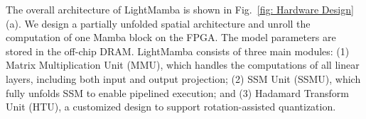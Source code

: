 The overall architecture of LightMamba is shown in Fig.~\ref{fig: Hardware Design} (a). 
We design a partially unfolded spatial architecture and unroll the computation of one Mamba block on the FPGA.
The model parameters are stored in the off-chip DRAM.
LightMamba consists of three main modules: (1) Matrix Multiplication Unit (MMU), which handles the computations of all linear layers, including both input and output projection; (2) SSM Unit (SSMU), which fully unfolds SSM to enable pipelined execution; and (3) Hadamard Transform Unit (HTU), a customized design to support rotation-assisted quantization.





